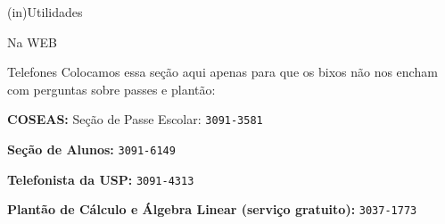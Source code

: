 \begin{secao}{(in)Utilidades}
\begin{subsecao}{Na WEB}
\end{subsecao}

\begin{subsecao}{Telefones}
Colocamos essa seção aqui apenas para que os bixos não nos encham com perguntas
sobre passes e plantão:

{\bf COSEAS:} Seção de Passe Escolar: {\tt 3091-3581}

{\bf Seção de Alunos:} {\tt 3091-6149}

{\bf Telefonista da USP:} {\tt 3091-4313}

{\bf Plantão de Cálculo e Álgebra Linear (serviço gratuito):} {\tt 3037-1773}

\end{subsecao}
\end{secao}

